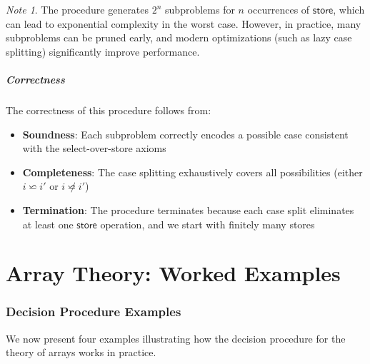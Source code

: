 \documentclass[11pt,a4paper]{article}
\theoremstyle{definition}
\theoremstyle{plain}
\theoremstyle{remark}
\newtheorem*{remark}{Note}
\begin{document}
\begin{remark}
The procedure generates $2^n$ subproblems for $n$ occurrences of $\textsf{store}$, which can lead to exponential complexity in the worst case. However, in practice, many subproblems can be pruned early, and modern optimizations (such as lazy case splitting) significantly improve performance.
\end{remark}

\subsubsection{Correctness}

The correctness of this procedure follows from:
\begin{itemize}
    \item \textbf{Soundness}: Each subproblem correctly encodes a possible case consistent with the select-over-store axioms
    \item \textbf{Completeness}: The case splitting exhaustively covers all possibilities (either $i \backsimeq i'$ or $i \not\backsimeq i'$)
    \item \textbf{Termination}: The procedure terminates because each case split eliminates at least one $\textsf{store}$ operation, and we start with finitely many stores
\end{itemize}






\newpage

\part{Array Theory: Worked Examples}

\section{Decision Procedure Examples}

We now present four examples illustrating how the decision procedure for the theory of arrays works in practice.
\end{document}
